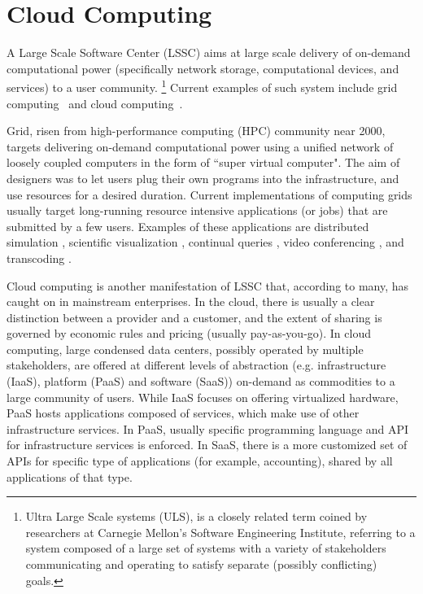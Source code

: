    \section{Cloud Computing}
 A Large Scale Software Center (LSSC) aims at large scale delivery of on-demand computational power (specifically network storage, computational devices, and services) to a user community.   
 \footnote{Ultra Large Scale systems (ULS), is a closely related term coined by researchers at Carnegie Mellon's Software Engineering Institute, referring to a system composed of a large set of systems with a variety of stakeholders communicating and operating to satisfy separate (possibly conflicting) goals.}
Current examples of such system include grid computing~\cite{foster1997globus,foster2002grid} and cloud computing~\cite{BHayesACMComm2008,MArmbrustEtAlTR2009,BRochwergerEtALIBM2009,RBuyyaEtAlFGCS2009}. 
    
Grid, risen from high-performance computing (HPC)  community near 2000, targets delivering on-demand computational power using a unified network of loosely coupled computers in the form of ``super virtual computer". The aim of designers was to let users plug their own programs into the infrastructure, and use resources for a desired duration. 
Current implementations of computing grids usually target long-running resource intensive applications (or jobs) that are submitted by a few users. Examples of these applications are distributed simulation \cite{ddsos,ddsos2},
scientific visualization \cite{wolf2002smartpointers}, 
continual queries \cite{babu2001continuous,kumar2005resource}, 
video conferencing \cite{huang2003network}, 
and transcoding \cite{radiantGrid}.  

Cloud computing is another manifestation of LSSC  that, according to many, has caught on in mainstream enterprises.
In the cloud, there is usually a clear distinction between a provider and a customer, and the extent of sharing is governed by economic rules and pricing (usually pay-as-you-go). 
In cloud computing, large condensed data centers, possibly operated by multiple stakeholders, are offered at different levels of abstraction (e.g. infrastructure (IaaS), platform (PaaS) and software (SaaS)) on-demand as commodities to a large community of users. While IaaS focuses on offering virtualized hardware, PaaS hosts applications composed of services, which make use of other infrastructure services. In PaaS, usually specific programming language and API for infrastructure services is enforced. 
In SaaS, there is a more customized set of APIs for specific type of applications (for example, accounting), shared by all applications of that type. 
 
